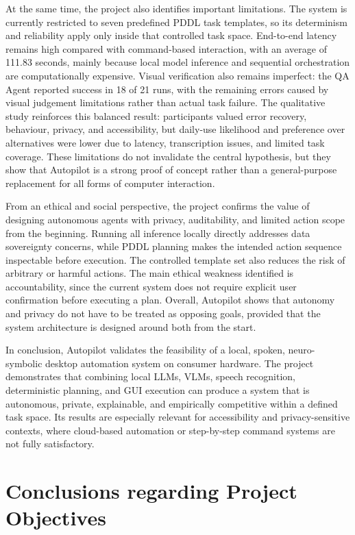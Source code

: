At the same time, the project also identifies important limitations. The system is currently restricted to seven predefined PDDL task templates, so its determinism and reliability apply only inside that controlled task space. End-to-end latency remains high compared with command-based interaction, with an average of 111.83 seconds, mainly because local model inference and sequential orchestration are computationally expensive. Visual verification also remains imperfect: the QA Agent reported success in 18 of 21 runs, with the remaining errors caused by visual judgement limitations rather than actual task failure. The qualitative study reinforces this balanced result: participants valued error recovery, behaviour, privacy, and accessibility, but daily-use likelihood and preference over alternatives were lower due to latency, transcription issues, and limited task coverage. These limitations do not invalidate the central hypothesis, but they show that Autopilot is a strong proof of concept rather than a general-purpose replacement for all forms of computer interaction.

From an ethical and social perspective, the project confirms the value of designing autonomous agents with privacy, auditability, and limited action scope from the beginning. Running all inference locally directly addresses data sovereignty concerns, while PDDL planning makes the intended action sequence inspectable before execution. The controlled template set also reduces the risk of arbitrary or harmful actions. The main ethical weakness identified is accountability, since the current system does not require explicit user confirmation before executing a plan. Overall, Autopilot shows that autonomy and privacy do not have to be treated as opposing goals, provided that the system architecture is designed around both from the start.

In conclusion, Autopilot validates the feasibility of a local, spoken, neuro-symbolic desktop automation system on consumer hardware. The project demonstrates that combining local LLMs, VLMs, speech recognition, deterministic planning, and GUI execution can produce a system that is autonomous, private, explainable, and empirically competitive within a defined task space. Its results are especially relevant for accessibility and privacy-sensitive contexts, where cloud-based automation or step-by-step command systems are not fully satisfactory.

\section{Conclusions regarding Project Objectives}

